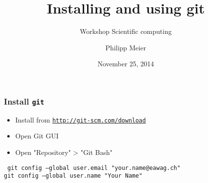 \documentclass{beamer}
\title{Installing and using git}
\subtitle{Workshop Scientific computing}
\author[P.\ Meier]{Philipp Meier}
\date{November 25, 2014}
\institute[EAWAG]{Eawag: Swiss Federal Institute of Aquatic Science and Technology}
\begin{document}
\begin{frame}[t,plain]
\titlepage
\end{frame}

\begin{frame}[t]
    \frametitle{Install \texttt{git}}
\begin{itemize}
\item Install from \texttt{\url{http://git-scm.com/download}}
\item Open Git GUI
\item Open "Repository" > "Git Bash"
\end{itemize}
\begin{block}{}
\tt
git config ---global user.email "your.name@eawag.ch"\\
git config ---global user.name "Your Name"
\end{block}
\end{frame}
\end{document}
